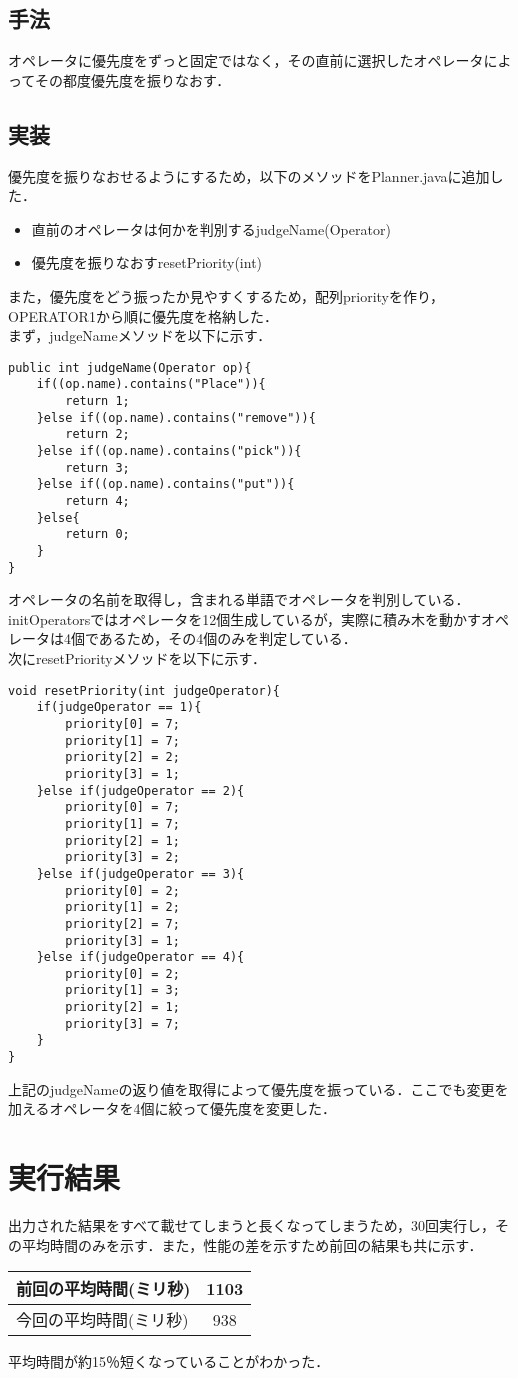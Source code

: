 \documentclass[a4j]{jarticle}
\begin{document}
\subsection{手法}
オペレータに優先度をずっと固定ではなく，その直前に選択したオペレータによってその都度優先度を振りなおす．

\subsection{実装}
優先度を振りなおせるようにするため，以下のメソッドをPlanner.javaに追加した．
\begin{itemize}
\item 直前のオペレータは何かを判別するjudgeName(Operator)
\item 優先度を振りなおすresetPriority(int)
\end{itemize}
また，優先度をどう振ったか見やすくするため，配列priorityを作り，OPERATOR1から順に優先度を格納した．\\
まず，judgeNameメソッドを以下に示す．
\begin{lstlisting}
public int judgeName(Operator op){
	if((op.name).contains("Place")){
		return 1;
	}else if((op.name).contains("remove")){
		return 2;
	}else if((op.name).contains("pick")){
		return 3;
	}else if((op.name).contains("put")){
		return 4;
	}else{
		return 0;
	}
}
\end{lstlisting}
オペレータの名前を取得し，含まれる単語でオペレータを判別している．initOperatorsではオペレータを12個生成しているが，実際に積み木を動かすオペレータは4個であるため，その4個のみを判定している．\\
次にresetPriorityメソッドを以下に示す．
\begin{lstlisting}
void resetPriority(int judgeOperator){
	if(judgeOperator == 1){
		priority[0] = 7;
		priority[1] = 7;
		priority[2] = 2;
		priority[3] = 1;
	}else if(judgeOperator == 2){
		priority[0] = 7;
		priority[1] = 7;
		priority[2] = 1;
		priority[3] = 2;
	}else if(judgeOperator == 3){
		priority[0] = 2;
		priority[1] = 2;
		priority[2] = 7;
		priority[3] = 1;
	}else if(judgeOperator == 4){
		priority[0] = 2;
		priority[1] = 3;
		priority[2] = 1;
		priority[3] = 7;
	}
}
\end{lstlisting}
上記のjudgeNameの返り値を取得によって優先度を振っている．ここでも変更を加えるオペレータを4個に絞って優先度を変更した．
\section{実行結果}
出力された結果をすべて載せてしまうと長くなってしまうため，30回実行し，その平均時間のみを示す．また，性能の差を示すため前回の結果も共に示す．
\begin{table}[H]
\begin{center}
\begin{tabular}{|l|c|}
\hline
前回の平均時間(ミリ秒) & 1103 \\ \hline
今回の平均時間(ミリ秒) & 938 \\ \hline
\end{tabular}
\end{center}
\end{table}
平均時間が約15％短くなっていることがわかった．
\end{document}
